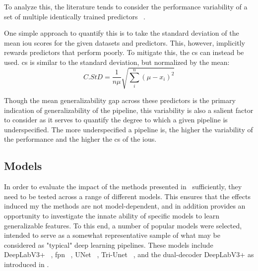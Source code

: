     To analyze this, the literature tends to consider the performance variability of a set of multiple identically trained predictors ~\cite{damour2020underspecification}.  
    
    One simple approach to quantify this is to take the standard deviation of the mean \gls{iou} scores for the given datasets and predictors. This, however, implicitly rewards predictors that perform poorly. To mitigate this, the \gls{cs} can instead be used. \gls{cs} is similar to the standard deviation, but normalized by the mean:
    \begin{equation}
        C.StD = \frac{1}{n \mu} \sqrt{ \sum_i^n (\mu - x_i)^2  }
    \end{equation}
    
     Though the mean generalizability gap across these predictors is the primary indication of generalizability of the pipeline, this variability is also a salient factor to consider as it serves to quantify the degree to which a given pipeline is underspecified. The more underspecified a pipeline is, the higher the variability of the performance and the higher the \gls{cs} of the \glspl{iou}.  

\subsection{Models} \label{model_choices}
In order to evaluate the impact of the methods presented in~ sufficiently, they need to be tested across a range of different models. This ensures that the effects induced my the methods are not model-dependent, and in addition provides an opportunity to investigate the innate ability of specific models to learn generalizable features. To this end, a number of popular models were selected, intended to serve as a somewhat representative sample of what may be considered as "typical" deep learning pipelines. These models include DeepLabV3+ ~\cite{deeplab}, \gls{fpn} ~\cite{fpn}, UNet ~\cite{unet}, Tri-Unet ~\cite{divergentnets}, and the dual-decoder DeepLabV3+ as introduced in . 

